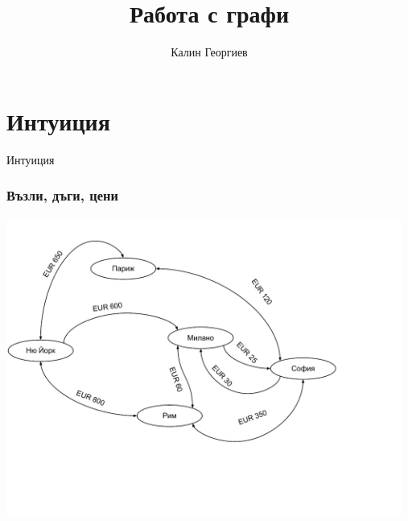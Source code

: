 \documentclass{beamer}
\begin{document}
\title[Структури от данни и програмиране]{Работа с графи} 
\author{Калин Георгиев} 
\frame{\titlepage} 

\section{Интуиция} 


\begin{frame}
\centerline{Интуиция}
\end{frame}


\begin{frame}[fragile]
\frametitle{Възли, дъги, цени}

\includegraphics[width=13cm]{images/graph_cities}

\end{frame}
\end{document}
